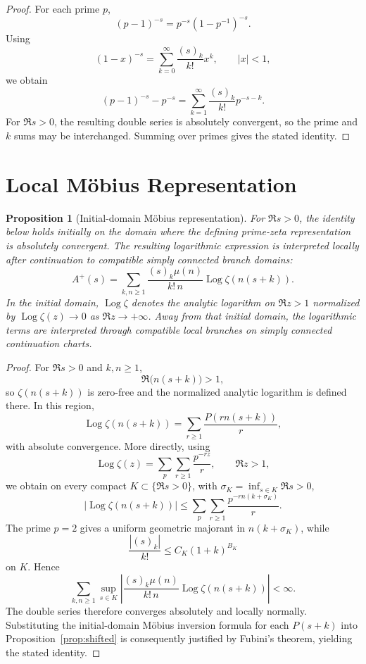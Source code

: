 \documentclass[11pt]{article}
\newtheorem{proposition}[theorem]{Proposition}
\theoremstyle{definition}
\newcommand{\Logz}{\operatorname{Log}}
\begin{document}
\begin{proof}
For each prime $p$,
\[
(p-1)^{-s}
=
p^{-s}(1-p^{-1})^{-s}.
\]
Using
\[
(1-x)^{-s}
=
\sum_{k=0}^{\infty}\frac{(s)_k}{k!}x^k,
\qquad |x|<1,
\]
we obtain
\[
(p-1)^{-s}-p^{-s}
=
\sum_{k=1}^{\infty}\frac{(s)_k}{k!}p^{-s-k}.
\]
For $\Re s>0$, the resulting double series is absolutely convergent, so the prime and $k$ sums may be interchanged. Summing over primes gives the stated identity.
\end{proof}

\section{Local Möbius Representation}

\begin{proposition}[Initial-domain Möbius representation]
\label{prop:local-mobius}
For $\Re s>0$, the identity below holds initially on the domain where the defining prime-zeta representation is absolutely convergent. The resulting logarithmic expression is interpreted locally after continuation to compatible simply connected branch domains:
\[
\boxed{
A^+(s)=
\sum_{k,n\ge1}
\frac{(s)_k\mu(n)}{k!\,n}
\Logz\zeta(n(s+k)).
}
\]
In the initial domain, $\Logz\zeta$ denotes the analytic logarithm on $\Re z>1$ normalized by
$\Logz\zeta(z)\to0$ as $\Re z\to+\infty$. Away from that initial domain, the logarithmic terms are interpreted through compatible local branches on simply connected continuation charts.
\end{proposition}

\begin{proof}
For $\Re s>0$ and $k,n\ge1$,
\[
\Re\bigl(n(s+k)\bigr)>1,
\]
so $\zeta(n(s+k))$ is zero-free and the normalized analytic logarithm is defined there. In this region,
\[
\Logz\zeta(n(s+k))
=
\sum_{r\ge1}\frac{P(rn(s+k))}{r},
\]
with absolute convergence. More directly, using
\[
\Logz\zeta(z)
=
\sum_{p}\sum_{r\ge1}\frac{p^{-rz}}{r},
\qquad \Re z>1,
\]
we obtain on every compact $K\subset\{\Re s>0\}$, with
$\sigma_K=\inf_{s\in K}\Re s>0$,
\[
\left|\Logz\zeta(n(s+k))\right|
\le
\sum_{p}\sum_{r\ge1}\frac{p^{-rn(k+\sigma_K)}}{r}.
\]
The prime $p=2$ gives a uniform geometric majorant in $n(k+\sigma_K)$, while
\[
\frac{|(s)_k|}{k!}\le C_K(1+k)^{B_K}
\]
on $K$. Hence
\[
\sum_{k,n\ge1}
\sup_{s\in K}
\left|
\frac{(s)_k\mu(n)}{k!\,n}
\Logz\zeta(n(s+k))
\right|
<\infty.
\]
The double series therefore converges absolutely and locally normally. Substituting the initial-domain Möbius inversion formula for each $P(s+k)$ into Proposition~\ref{prop:shifted} is consequently justified by Fubini's theorem, yielding the stated identity.
\end{proof}
\end{document}
